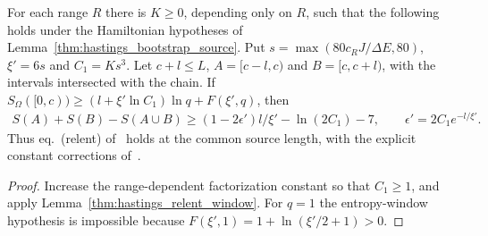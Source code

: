 \begin{lemma}
    \label{thm:hastings_relent_source}
    \leanok
    For each range $R$ there is $K\ge0$, depending only on $R$, such that
    the following holds under the Hamiltonian hypotheses of
    Lemma~\ref{thm:hastings_bootstrap_source}. Put
    $s=\max(80c_RJ/\Delta E,80)$, $\xi'=6s$ and $C_1=Ks^3$.
    Let $c+l\le L$, $A=\lbrack c-l,c)$ and $B=\lbrack c,c+l)$, with the intervals
    intersected with the chain. If
    $S_\Omega([0,c))\ge(l+\xi'\ln C_1)\ln q+F(\xi',q)$, then
    \begin{align}
        S(A)+S(B)-S(A\cup B)
        \ge(1-2\epsilon')l/\xi'-\ln(2C_1)-7,
        \qquad \epsilon'=2C_1e^{-l/\xi'}.
        \label{eq:hastings_relent_source}
    \end{align}
    Thus eq.~(relent) of~\cite[lines 234--242 and 413--503]{Hastings2007AreaLaw}
    holds at the common source length, with the explicit constant
    corrections of~\cite{gap:hastings07_relent_constants}.
\end{lemma}
\begin{proof}\leanok
    Increase the range-dependent factorization constant so that
    $C_1\ge1$, and apply Lemma~\ref{thm:hastings_relent_window}.
    For $q=1$ the entropy-window hypothesis is impossible because
    $F(\xi',1)=1+\ln(\xi'/2+1)>0$.
\end{proof}
